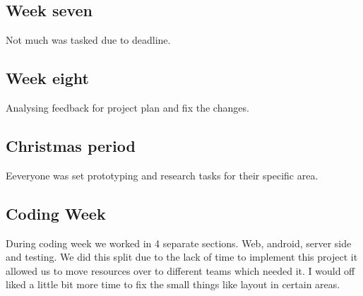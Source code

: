 \subsection{Week seven}
	Not much was tasked due to deadline.
\subsection{Week eight}
	Analysing feedback for project plan and fix the changes.
\subsection{Christmas period}
	Eeveryone was set prototyping and research tasks for their specific area.
\subsection{Coding Week}
	During coding week we worked in 4 separate sections. Web, android, server side and testing. We did this split due to the lack of time to implement this project it allowed us to move resources over to different teams which needed it. I would off liked a little bit more time to fix the small things like layout in certain areas.